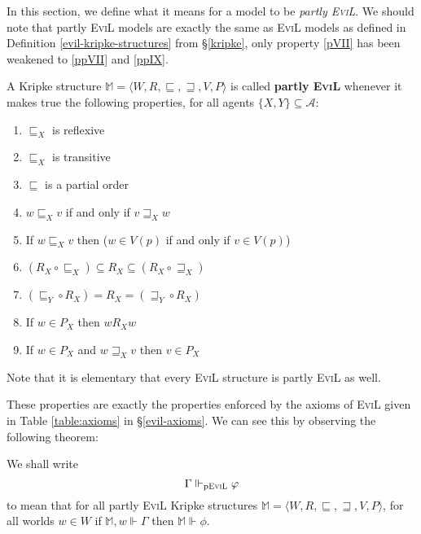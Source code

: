 In this section, we define what it means for a model to be
\emph{partly \textsc{EviL}}.  We should note that partly \textsc{EviL}
models are exactly the same as \textsc{EviL} models as defined in Definition
  \ref{evil-kripke-structures} from \S\ref{kripke}, only property
  \ref{pVII} has been weakened to \ref{ppVII} and \ref{ppIX}.

\begin{definition}\label{partly-evil}
A Kripke structure $\mathbb{M}=\langle W, R, \sqsubseteq, \sqsupseteq, V, P \rangle$ is called \textbf{partly
  \textsc{EviL}} whenever it makes true the following properties, for
all agents $\{X,Y\} \subseteq \mathcal{A}$:
  \begin{enumerate}[label=\textup{(\emph{\Roman*})$'$}, topsep=0.0in, parsep=0.075in]
    \item\label{ppI} $\sqsubseteq_X$ is reflexive
    \item \label{pptrans} $\sqsubseteq_X$ is transitive 
    \item \label{ppantisym} $\sqsubseteq$ is a partial order
    \item \label{ppreverse} $w \sqsubseteq_X v$ if and only if $v
    \sqsupseteq_X w$
    \item \label{islandiff} If $w \sqsubseteq_X v$ then ($w \in V (p)$ if and only if $v
    \in V (p)$)
    \item \label{ppV}$(R_X \circ \sqsubseteq_X) \subseteq
    R_X \subseteq (R_X \circ \sqsupseteq_X)$
    \item \label{ppVI} $(\sqsubseteq_Y \circ R_X) = R_X =
    (\sqsupseteq_Y \circ R_X)$
    \item\label{ppVII} If $w \in P_X$ then $w
    R_X w$
    \item\label{ppIX} If $w \in P_X$ and $w \sqsupseteq_X v$ then $v
    \in P_X$
  \end{enumerate}
\end{definition}

Note that it is elementary that every \textsc{EviL} structure is
partly \textsc{EviL} as well.

These properties are exactly the properties enforced
by the axioms of \textsc{EviL} given in Table \ref{table:axioms} in
\S\ref{evil-axioms}. We can see this by observing the following
theorem:

\begin{definition}\label{pEviL-Vdash}
We shall write
\[ \Gamma \Vdash_{\textup{p\textsc{EviL}}} \phi \]
to mean that for all partly \textsc{EviL} Kripke structures
$\mathbb{M} = \langle W, R, \sqsubseteq, \sqsupseteq, V, P \rangle$,
for all worlds $w \in W$ if $\mathbb{M},w \Vdash \Gamma$ then $\mathbb{M} \Vdash \phi$.
\end{definition}

